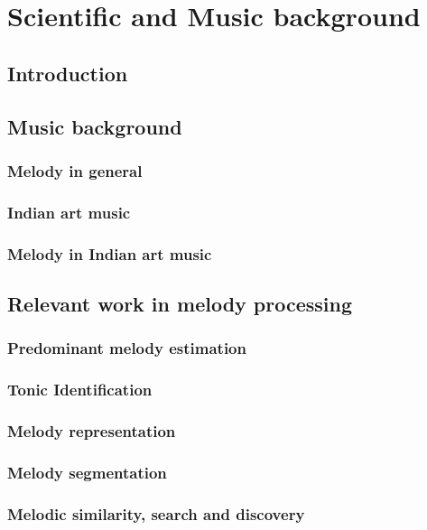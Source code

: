 
\chapter{Scientific and Music background}
\label{chap:background}

\section{Introduction}

\section{Music background}
\label{sec:music_background}

\subsection{Melody in general}
\subsection{Indian art music}
\subsection{Melody in Indian art music}

\section{Relevant work in melody processing}
\subsection{Predominant melody estimation}
\subsection{Tonic Identification}
\subsection{Melody representation}
\subsection{Melody segmentation}
\subsection{Melodic similarity, search and discovery}
